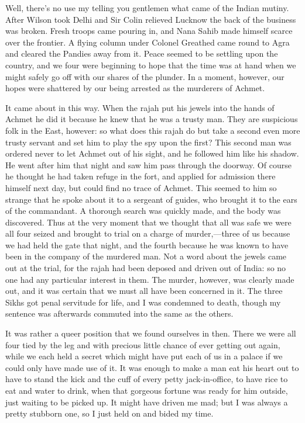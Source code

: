 Well, there's no use my telling you gentlemen what came of the Indian mutiny. After Wilson took Delhi and Sir Colin relieved Lucknow the back of the business was broken. Fresh troops came pouring in, and Nana Sahib made himself scarce over the frontier. A flying column under Colonel Greathed came round to Agra and cleared the Pandies away from it. Peace seemed to be settling upon the country, and we four were beginning to hope that the time was at hand when we might safely go off with our shares of the plunder. In a moment, however, our hopes were shattered by our being arrested as the murderers of Achmet.

It came about in this way. When the rajah put his jewels into the hands of Achmet he did it because he knew that he was a trusty man. They are suspicious folk in the East, however: so what does this rajah do but take a second even more trusty servant and set him to play the spy upon the first? This second man was ordered never to let Achmet out of his sight, and he followed him like his shadow. He went after him that night and saw him pass through the doorway. Of course he thought he had taken refuge in the fort, and applied for admission there himself next day, but could find no trace of Achmet. This seemed to him so strange that he spoke about it to a sergeant of guides, who brought it to the ears of the commandant. A thorough search was quickly made, and the body was discovered. Thus at the very moment that we thought that all was safe we were all four seized and brought to trial on a charge of murder,—three of us because we had held the gate that night, and the fourth because he was known to have been in the company of the murdered man. Not a word about the jewels came out at the trial, for the rajah had been deposed and driven out of India: so no one had any particular interest in them. The murder, however, was clearly made out, and it was certain that we must all have been concerned in it. The three Sikhs got penal servitude for life, and I was condemned to death, though my sentence was afterwards commuted into the same as the others.

It was rather a queer position that we found ourselves in then. There we were all four tied by the leg and with precious little chance of ever getting out again, while we each held a secret which might have put each of us in a palace if we could only have made use of it. It was enough to make a man eat his heart out to have to stand the kick and the cuff of every petty jack-in-office, to have rice to eat and water to drink, when that gorgeous fortune was ready for him outside, just waiting to be picked up. It might have driven me mad; but I was always a pretty stubborn one, so I just held on and bided my time.


